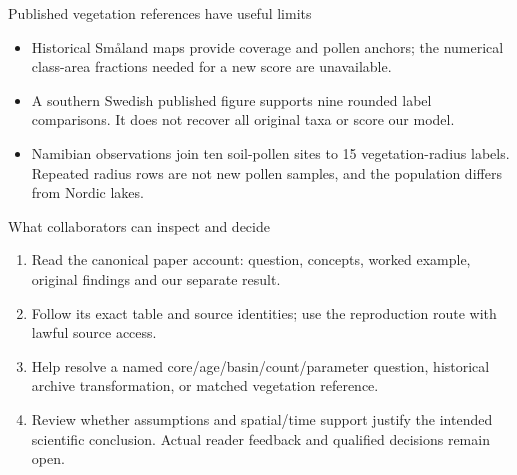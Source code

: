 \begin{frame}{Published vegetation references have useful limits}
\begin{itemize}
\item Historical Sm\aa land maps provide coverage and pollen anchors; the numerical class-area fractions needed for a new score are unavailable.
\item A southern Swedish published figure supports nine rounded label comparisons. It does not recover all original taxa or score our model.
\item Namibian observations join ten soil-pollen sites to 15 vegetation-radius labels. Repeated radius rows are not new pollen samples, and the population differs from Nordic lakes.
\end{itemize}
\end{frame}

\begin{frame}{What collaborators can inspect and decide}
\begin{enumerate}
\item Read the canonical paper account: question, concepts, worked example, original findings and our separate result.
\item Follow its exact table and source identities; use the reproduction route with lawful source access.
\item Help resolve a named core/age/basin/count/parameter question, historical archive transformation, or matched vegetation reference.
\item Review whether assumptions and spatial/time support justify the intended scientific conclusion. Actual reader feedback and qualified decisions remain open.
\end{enumerate}
\end{frame}

